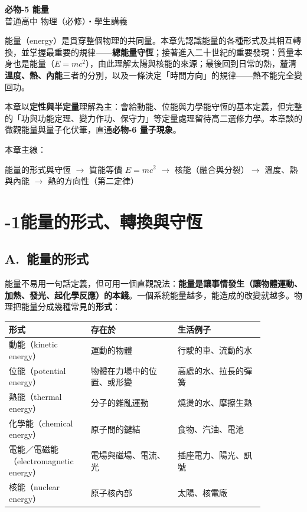 \documentclass[11pt]{article}
\begin{document}
\begin{center}
{\sffamily\Huge\bfseries 必物-5 能量}\\[3pt]
{\sffamily\large 普通高中 物理（必修）・學生講義}
\end{center}
\vspace{0.6em}

能量（energy）是貫穿整個物理的共同量。本章先認識能量的各種形式及其相互轉換，並掌握最重要的規律——\textbf{總能量守恆}；接著進入二十世紀的重要發現：質量本身也是能量（$E=mc^2$），由此理解太陽與核能的來源；最後回到日常的熱，釐清\textbf{溫度、熱、內能}三者的分別，以及一條決定「時間方向」的規律——熱不能完全變回功。

本章以\textbf{定性與半定量}理解為主：會給動能、位能與力學能守恆的基本定義，但完整的「功與功能定理、變力作功、保守力」等定量處理留待高二選修力學。本章談的微觀能量與量子化伏筆，直通\textbf{必物-6 量子現象}。

\medskip
本章主線：

\begin{center}
能量的形式與守恆 $\rightarrow$ 質能等價 $E=mc^2$ $\rightarrow$ 核能（融合與分裂）$\rightarrow$ 溫度、熱與內能 $\rightarrow$ 熱的方向性（第二定律）
\end{center}

\section*{-1\quad 能量的形式、轉換與守恆}

\subsection*{\sffamily A.\ 能量的形式}

能量不易用一句話定義，但可用一個直觀說法：\textbf{能量是讓事情發生（讓物體運動、加熱、發光、起化學反應）的本錢}。一個系統能量越多，能造成的改變就越多。物理把能量分成幾種常見的\textbf{形式}：

\begin{center}
\renewcommand{\arraystretch}{1.3}
\begin{tabular}{p{0.26\linewidth} p{0.30\linewidth} p{0.30\linewidth}}
\hline
\textbf{形式} & \textbf{存在於} & \textbf{生活例子} \\
\hline
動能（kinetic energy） & 運動的物體 & 行駛的車、流動的水 \\
位能（potential energy） & 物體在力場中的位置、或形變 & 高處的水、拉長的彈簧 \\
熱能（thermal energy） & 分子的雜亂運動 & 燒燙的水、摩擦生熱 \\
化學能（chemical energy） & 原子間的鍵結 & 食物、汽油、電池 \\
電能／電磁能（electromagnetic energy） & 電場與磁場、電流、光 & 插座電力、陽光、訊號 \\
核能（nuclear energy） & 原子核內部 & 太陽、核電廠 \\
\hline
\end{tabular}
\end{center}
\end{document}
